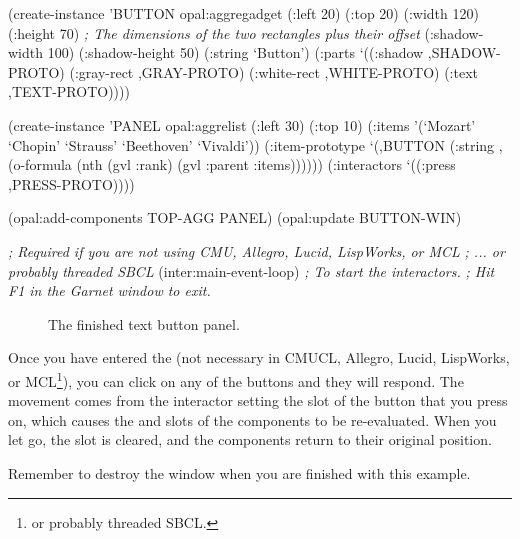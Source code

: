 \begin{programexample}
(create-instance 'BUTTON opal:aggregadget
   (:left 20) (:top 20)
   (:width 120) (:height 70)  {\it ; The dimensions of the two rectangles plus their offset}
   (:shadow-width 100) (:shadow-height 50)
   (:string `Button')
   (:parts
    `((:shadow ,SHADOW-PROTO)
      (:gray-rect ,GRAY-PROTO)
      (:white-rect ,WHITE-PROTO)
      (:text ,TEXT-PROTO))))

(create-instance 'PANEL opal:aggrelist
   (:left 30) (:top 10)
   (:items '(`Mozart' `Chopin' `Strauss' `Beethoven' `Vivaldi'))
   (:item-prototype
    `(,BUTTON
      (:string ,(o-formula (nth (gvl :rank) (gvl :parent :items))))))
   (:interactors
    `((:press ,PRESS-PROTO))))

(opal:add-components TOP-AGG PANEL)
(opal:update BUTTON-WIN)

{\it ; Required if you are not using CMU, Allegro, Lucid, LispWorks, or MCL}
\textit{; ... or probably threaded SBCL}
(inter:main-event-loop)  {\it ; To start the interactors.}
                         {\it ; Hit F1 in the Garnet window to exit.}
\end{programexample}

\begin{figure}
\begin{center}
\begin{makeimage}
\end{makeimage}
\begin{latexonly}
\end{latexonly}
\end{center}
\caption{The finished text button panel.}
\end{figure}

Once you have entered the  (not necessary in CMUCL,
Allegro, Lucid, LispWorks, or MCL\footnote{or probably threaded SBCL.}), you can click on any of the buttons and
they will respond.  The movement comes from the interactor setting the
 slot of the button that you press on, which
causes the  and  slots of the components to be
re-evaluated.  When you let go, the  slot is
cleared, and the components return to their original position.

Remember to destroy the window when you are finished with this example.

